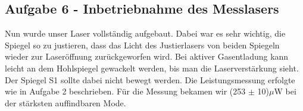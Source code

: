 \subsection{Aufgabe 6 - Inbetriebnahme des Messlasers}

Nun wurde unser Laser vollständig aufgebaut. Dabei war es sehr wichtig, die Spiegel so zu justieren, dass das Licht des Justierlasers von beiden Spiegeln wieder zur Laseröffnung zurückgeworfen wird. Bei aktiver Gasentladung kann leicht an dem Hohlspiegel gewackelt werden, bis man die Laserverstärkung sieht. Der Spiegel S1 sollte dabei nicht bewegt werden. Die Leistungsmessung erfolgte wie in Aufgabe 2 beschrieben.
Für die Messung bekamen wir (253 $\pm$ 10)$\mu$W bei der stärksten auffindbaren Mode. 


